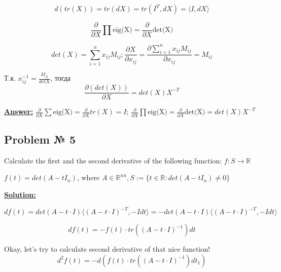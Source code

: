 \begin{equation*}
    d(tr(X)) = tr(dX) = tr(I^T, dX) = \langle I, dX \rangle
\end{equation*}

\begin{equation*}
    \frac{\partial}{\partial X} \prod \text{eig(X)} = \frac{\partial}{\partial X} \text{det(X)}
\end{equation*}

\begin{equation*}
    det(X) = \sum\limits_{i=1}^n x_{ij}M_{ij}; \frac{\partial X}{\partial x_{ij}} = \frac{ \partial \sum\limits_{i=1}^n x_{ij}M_{ij}}{\partial x_{ij}} = M_{ij}
\end{equation*}

Т.к. $x_{ij}^{-1} = \frac{M_{ji}}{detX}$, тогда
\begin{equation*}
    \frac{\partial (det(X))}{\partial X} = det(X)X^{-T}
\end{equation*}

\underline{\textbf{Answer:}}
 $\frac{\partial}{\partial X} \sum \text{eig(X)} = \frac{\partial}{\partial X} tr(X) = I$; 
 $\frac{\partial}{\partial X} \prod \text{eig(X)} = \frac{\partial}{\partial X} \text{det(X)} = det(X)X^{-T}$
 
 
\subsection{Problem № 5}
Calculate the first and the second derivative of the following function: $f : S \rightarrow \mathds{R}$

$f(t) = det(A-tI_n)$, where $A \in \mathds{R}^{n \dot n}, S := \{ t \in \mathds{R} : det(A-tI_n) \not = 0 \}$

\underline{\textbf{Solution:}}

\begin{equation*}
    df(t) = det(A-t\cdot I) \langle (A - t \cdot I)^{-T}, -Idt \rangle = -det(A-t\cdot I) \langle (A - t \cdot I)^{-T}, -Idt \rangle
\end{equation*}

\begin{equation*}
    df(t) = -f(t) \cdot tr \left( (A-t \cdot I)^{-1} \right) dt
\end{equation*}

Okay, let's try to calculate second derivative of that nice function!
\begin{equation*}
    d^2f(t) = -d\left(f(t) \cdot tr \left( (A-t \cdot I)^{-1} \right) dt_1 \right)
\end{equation*}

